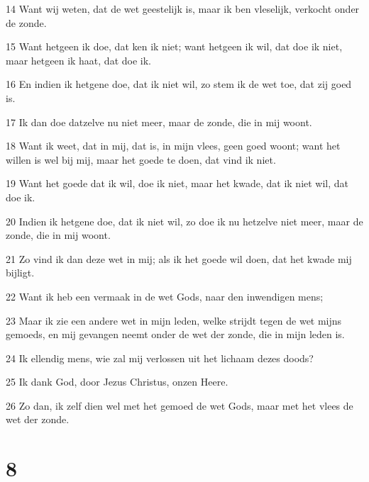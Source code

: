 \par 14 Want wij weten, dat de wet geestelijk is, maar ik ben vleselijk, verkocht onder de zonde.
\par 15 Want hetgeen ik doe, dat ken ik niet; want hetgeen ik wil, dat doe ik niet, maar hetgeen ik haat, dat doe ik.
\par 16 En indien ik hetgene doe, dat ik niet wil, zo stem ik de wet toe, dat zij goed is.
\par 17 Ik dan doe datzelve nu niet meer, maar de zonde, die in mij woont.
\par 18 Want ik weet, dat in mij, dat is, in mijn vlees, geen goed woont; want het willen is wel bij mij, maar het goede te doen, dat vind ik niet.
\par 19 Want het goede dat ik wil, doe ik niet, maar het kwade, dat ik niet wil, dat doe ik.
\par 20 Indien ik hetgene doe, dat ik niet wil, zo doe ik nu hetzelve niet meer, maar de zonde, die in mij woont.
\par 21 Zo vind ik dan deze wet in mij; als ik het goede wil doen, dat het kwade mij bijligt.
\par 22 Want ik heb een vermaak in de wet Gods, naar den inwendigen mens;
\par 23 Maar ik zie een andere wet in mijn leden, welke strijdt tegen de wet mijns gemoeds, en mij gevangen neemt onder de wet der zonde, die in mijn leden is.
\par 24 Ik ellendig mens, wie zal mij verlossen uit het lichaam dezes doods?
\par 25 Ik dank God, door Jezus Christus, onzen Heere.
\par 26 Zo dan, ik zelf dien wel met het gemoed de wet Gods, maar met het vlees de wet der zonde.

\chapter{8}

